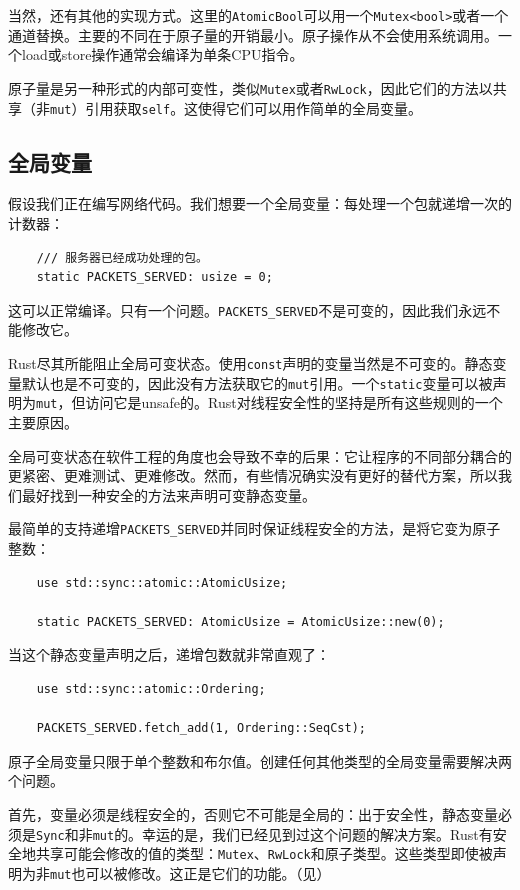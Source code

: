 当然，还有其他的实现方式。这里的\texttt{AtomicBool}可以用一个\texttt{Mutex<bool>}或者一个通道替换。主要的不同在于原子量的开销最小。原子操作从不会使用系统调用。一个load或store操作通常会编译为单条CPU指令。

原子量是另一种形式的内部可变性，类似\texttt{Mutex}或者\texttt{RwLock}，因此它们的方法以共享（非\texttt{mut}）引用获取\texttt{self}。这使得它们可以用作简单的全局变量。

\subsection{全局变量}\label{globalvar}
假设我们正在编写网络代码。我们想要一个全局变量：每处理一个包就递增一次的计数器：
\begin{verbatim}
    /// 服务器已经成功处理的包。
    static PACKETS_SERVED: usize = 0;
\end{verbatim}

这可以正常编译。只有一个问题。\texttt{PACKETS\_SERVED}不是可变的，因此我们永远不能修改它。

Rust尽其所能阻止全局可变状态。使用\texttt{const}声明的变量当然是不可变的。静态变量默认也是不可变的，因此没有方法获取它的\texttt{mut}引用。一个\texttt{static}变量可以被声明为\texttt{mut}，但访问它是unsafe的。Rust对线程安全性的坚持是所有这些规则的一个主要原因。

全局可变状态在软件工程的角度也会导致不幸的后果：它让程序的不同部分耦合的更紧密、更难测试、更难修改。然而，有些情况确实没有更好的替代方案，所以我们最好找到一种安全的方法来声明可变静态变量。

最简单的支持递增\texttt{PACKETS\_SERVED}并同时保证线程安全的方法，是将它变为原子整数：
\begin{verbatim}
    use std::sync::atomic::AtomicUsize;

    static PACKETS_SERVED: AtomicUsize = AtomicUsize::new(0);
\end{verbatim}

当这个静态变量声明之后，递增包数就非常直观了：
\begin{verbatim}
    use std::sync::atomic::Ordering;

    PACKETS_SERVED.fetch_add(1, Ordering::SeqCst);
\end{verbatim}

原子全局变量只限于单个整数和布尔值。创建任何其他类型的全局变量需要解决两个问题。

首先，变量必须是线程安全的，否则它不可能是全局的：出于安全性，静态变量必须是\texttt{Sync}和非\texttt{mut}的。幸运的是，我们已经见到过这个问题的解决方案。Rust有安全地共享可能会修改的值的类型：\texttt{Mutex}、\texttt{RwLock}和原子类型。这些类型即使被声明为非\texttt{mut}也可以被修改。这正是它们的功能。（见）

